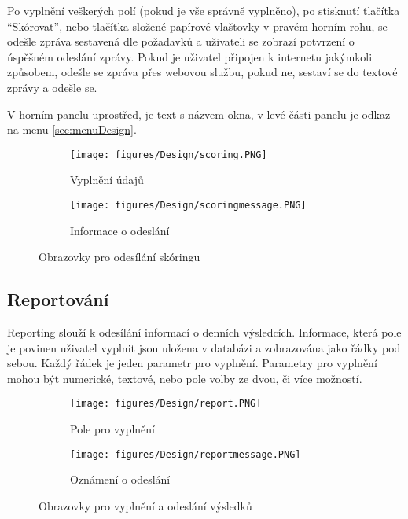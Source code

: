 \documentclass[11pt,twoside,a4paper]{book}
\begin{document}
Po vyplnění veškerých polí (pokud je vše správně vyplněno), po stisknutí tlačítka “Skórovat”, nebo tlačítka složené papírové vlaštovky v pravém horním rohu, se odešle zpráva sestavená dle požadavků a uživateli se zobrazí potvrzení o úspěšném odeslání zprávy. Pokud je uživatel připojen k internetu jakýmkoli způsobem, odešle se zpráva přes webovou službu, pokud ne, sestaví se do textové zprávy a odešle se. 

V horním panelu uprostřed, je text s názvem okna, v levé části panelu je odkaz na menu \ref{sec:menuDesign}.

\begin{figure}[ht]
	\centering
	\begin{subfigure}{.4\textwidth}
	  	\centering
	  	\texttt{[image: figures/Design/scoring.PNG]}
	  	\caption{Vyplnění údajů}
	  	\label{fig:scoringscreensa}
	\end{subfigure}
	\begin{subfigure}{.4\textwidth}
	  	\centering
		\texttt{[image: figures/Design/scoringmessage.PNG]}
	  	\caption{Informace o odeslání}
	  	\label{fig:scoringscreensb}
	\end{subfigure}
\caption{Obrazovky pro odesílání skóringu}
\label{fig:scoringscreens}
\end{figure}

\subsection{Reportování} \label{sec:reportDesign}
Reporting slouží k odesílání informací o denních výsledcích. Informace, která pole je povinen uživatel vyplnit jsou uložena v databázi a zobrazována jako řádky pod sebou. Každý řádek je jeden parametr pro vyplnění. Parametry pro vyplnění mohou být numerické, textové, nebo pole volby ze dvou, či více možností.

\begin{figure}[ht]
	\centering
	\begin{subfigure}{.4\textwidth}
	  	\centering
	  	\texttt{[image: figures/Design/report.PNG]}
	  	\caption{Pole pro vyplnění}
	  	\label{fig:reportscreena}
	\end{subfigure}
	\begin{subfigure}{.4\textwidth}
	  	\centering
		\texttt{[image: figures/Design/reportmessage.PNG]}
	  	\caption{Oznámení o odeslání}
	  	\label{fig:reportscreenb}
	\end{subfigure}
\caption{Obrazovky pro vyplnění a odeslání výsledků}
\label{fig:reportscreen}
\end{figure}
\end{document}
